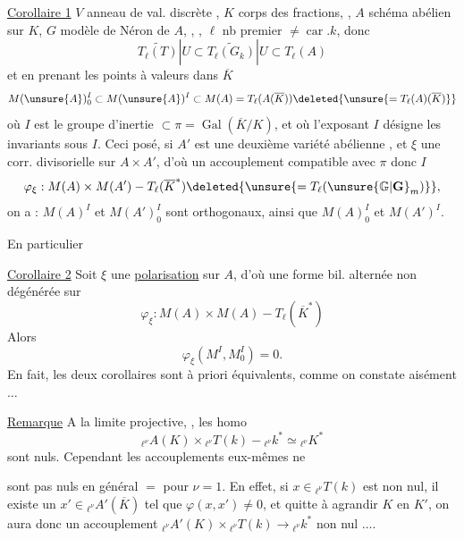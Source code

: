 \uline{Corollaire 1} $V$ anneau de val. discrète , $K$ corps des fractions, , $A$ schéma abélien sur $K$, $G$ modèle de Néron de $A$, , , $\ell$ nb premier $\ne\operatorname{car}.k$,  donc
\[
\widetilde{T_\ell(T)}|U\subset\widetilde{T_\ell(G_k)}|U\subset T_\ell(A)
\]
et en prenant les points à valeurs dans $\overline K$
\[
M(\unsure{A})_0^I\subset M(\unsure{A})^I\subset M(A)=T_\ell(A(\overline K))\deleted{\unsure{=T_\ell(A)(\overline K)}}
\]
où $I$ est le groupe d'inertie $\subset\pi=\operatorname{Gal}(\overline K/K)$, et où l'exposant $I$ désigne les invariants sous $I$.
Ceci posé, si $A'$ est une deuxième variété abélienne , et $\xi$ une  corr. divisorielle sur $A\times A'$, d'où un accouplement compatible avec $\pi$ donc $I$
\[
\varphi_\xi:M(A)\times M(A')\mathbin{-}T_\ell(\overline K^*)\deleted{\unsure{=T_\ell(\unsure{\mathbb G|\mathbf G}_m)}},
\]
on a :  $M(A)^I$ et $M(A')_0^I$ sont orthogonaux, ainsi que $M(A)_0^I$ et $M(A')^I$.

En particulier

\uline{Corollaire 2} Soit $\xi$ une \uline{polarisation} sur $A$, d'où une forme bil. alternée non dégénérée sur
\[
\varphi_\xi:M(A)\times M(A)\mathbin{-}T_\ell(\overline K^*)
\]
Alors
\[
\varphi_\xi(M^I,M_0^I)=0.
\]
En fait, les deux corollaires sont à priori équivalents, comme on constate aisément $\ldots$

\uline{Remarque} A la limite projective, , les homo
\[
{}_{\ell^\nu}A(K)\times{}_{\ell^\nu}T(k)\mathbin{-}{}_{\ell^\nu}k^*\simeq{}_{\ell^\nu}K^*
\]
sont nuls. Cependant les accouplements eux-mêmes ne

sont pas nuls en général $=$ pour $\nu=1$. En effet,
si  $x\in{}_{\ell^\nu}T(k)$ est non nul, il existe un
$x'\in{}_{\ell^\nu}A'(\overline K)$ tel que \deleted{\unsure{$\varphi$}} $\varphi(x,x')\ne0$, et  quitte
à agrandir $K$ en $K'$, on aura donc un
accouplement ${}_{\ell^\nu}A'(K)\times{}_{\ell^\nu}T(k)\longrightarrow{}_{\ell^\nu}k^*$ non nul $\ldots$.

